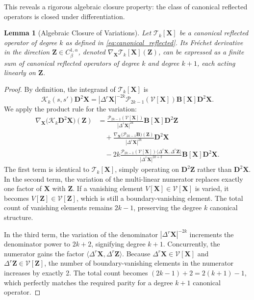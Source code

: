 \documentclass{amsart}
\newtheorem{lemma}[theorem]{Lemma}
\begin{document}
This reveals a rigorous algebraic closure property: the class of canonical reflected operators is closed under differentiation.

\begin{lemma}[Algebraic Closure of Variations]\label{lem:closure_variations}
Let $\mathcal{T}_k[\mathbf{X}]$ be a canonical reflected operator of degree $k$ as defined in \eqref{eq:canonical_reflected}. Its Fréchet derivative in the direction $\mathbf{Z} \in C^{1,\alpha}_\beta$, denoted $\nabla_{\mathbf{X}}\mathcal{T}_k[\mathbf{X}](\mathbf{Z})$, can be expressed as a finite sum of canonical reflected operators of degree $k$ and degree $k+1$, each acting linearly on $\mathbf{Z}$.
\end{lemma}

\begin{proof}
By definition, the integrand of $\mathcal{T}_k[\mathbf{X}]$ is $$\mathcal{K}_k(s,s') \mathbf{D}^2\mathbf{X} = |\Delta^r \mathbf{X}|^{-2k} \mathcal{P}_{2k-1}(\mathcal{V}[\mathbf{X}]) \mathbf{B}[\mathbf{X}] \mathbf{D}^2\mathbf{X}.$$ We apply the product rule for the variation:
\begin{align*}
\nabla_{\mathbf{X}} \big( \mathcal{K}_k \mathbf{D}^2\mathbf{X} \big)(\mathbf{Z}) 
&= \frac{\mathcal{P}_{2k-1}(\mathcal{V}[\mathbf{X}])}{|\Delta^r \mathbf{X}|^{2k}} \mathbf{B}[\mathbf{X}] \mathbf{D}^2\mathbf{Z} \\
&\quad + \frac{ \nabla_{\mathbf{X}} \big( \mathcal{P}_{2k-1} \mathbf{B} \big)(\mathbf{Z}) }{|\Delta^r \mathbf{X}|^{2k}} \mathbf{D}^2\mathbf{X} \\
&\quad - 2k \frac{ \mathcal{P}_{2k-1}(\mathcal{V}[\mathbf{X}]) \langle \Delta^r \mathbf{X}, \Delta^r \mathbf{Z} \rangle }{|\Delta^r \mathbf{X}|^{2k+2}} \mathbf{B}[\mathbf{X}] \mathbf{D}^2\mathbf{X}.
\end{align*}
The first term is identical to $\mathcal{T}_k[\mathbf{X}]$, simply operating on $\mathbf{D}^2\mathbf{Z}$ rather than $\mathbf{D}^2\mathbf{X}$. In the second term, the variation of the multi-linear numerator replaces exactly one factor of $\mathbf{X}$ with $\mathbf{Z}$. If a vanishing element $V[\mathbf{X}] \in \mathcal{V}[\mathbf{X}]$ is varied, it becomes $V[\mathbf{Z}] \in \mathcal{V}[\mathbf{Z}]$, which is still a boundary-vanishing element. The total count of vanishing elements remains $2k-1$, preserving the degree $k$ canonical structure.

In the third term, the variation of the denominator $|\Delta^r \mathbf{X}|^{-2k}$ increments the denominator power to $2k+2$, signifying degree $k+1$. Concurrently, the numerator gains the factor $\langle \Delta^r \mathbf{X}, \Delta^r \mathbf{Z} \rangle$. Because $\Delta^r \mathbf{X} \in \mathcal{V}[\mathbf{X}]$ and $\Delta^r \mathbf{Z} \in \mathcal{V}[\mathbf{Z}]$, the number of boundary-vanishing elements in the numerator increases by exactly 2. The total count becomes $(2k-1) + 2 = 2(k+1) - 1$, which perfectly matches the required parity for a degree $k+1$ canonical operator.
\end{proof}
\end{document}
